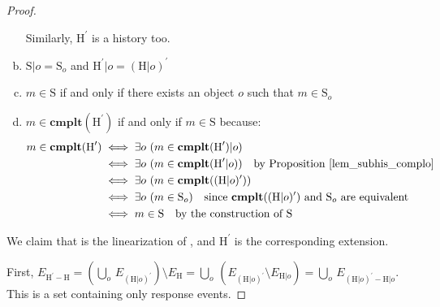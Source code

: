 \documentclass[a4paper,USenglish]{lipics-v2016}
\newcommand{\linz}{linearization}
\newcommand{\cmplt}{\textbf{cmplt}}
\newcommand{\his}{\text{H}}
\newcommand{\shis}{\text{S}}
\newcommand{\evts}{\textit{E}}
\newcommand{\myvert}{\vert}
\begin{document}
\begin{proof}
\begin{enumerate}[(a)]
		Similarly, $\his^\prime$ is a history too.
		\item
		$\shis \myvert o = \shis_o$ and $\his^\prime \myvert o = (\his \myvert o)^\prime$
		\item
		$m \in \shis$ if and only if there exists an object $o$ such that $m \in \shis_o$
		\item
		$m \in \cmplt(\his^\prime)$ if and only if $m \in \shis$ because:
		\begin{align*}
		m \in \cmplt(\his^\prime) &\iff \exists o \ (m \in \cmplt(\his^\prime) \myvert o)\\
		&\iff \exists o \ (m \in \cmplt(\his^\prime \myvert o)) \quad \text{by Proposition \ref{lem_subhis_complo}}\\
		&\iff \exists o \ (m \in \cmplt((\his \myvert o)^\prime))\\
		&\iff \exists o \ (m \in \shis_o) \quad \text{since $\cmplt((\his \myvert o)^\prime)$ and $\shis_o$ are equivalent}\\
		&\iff m \in \shis \quad \text{by the construction of \shis}
		\end{align*}
	\end{enumerate}
	
	We claim that {\shis} is the {\linz} of {\his}, and $\his^\prime$ is the corresponding extension.
	
	First, $\evts_{\his^\prime - \his} = (\bigcup\limits_o \, \evts_{(\his \myvert o)^\prime}) \setminus \evts_{\his} = \bigcup\limits_o \, (\evts_{(\his \myvert o)^\prime} \setminus \evts_{\his \myvert o}) = \bigcup\limits_o \, \evts_{(\his \myvert o)^\prime - \his \myvert o}$. This is a set containing only response events.
	

\end{proof}
\end{document}
